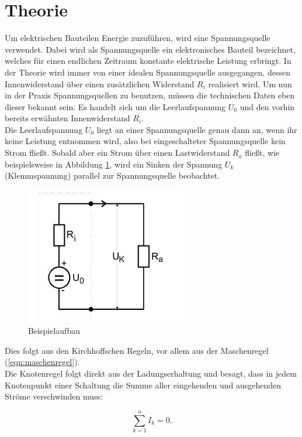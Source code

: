 \section{Theorie}
\label{sec:Theorie}
Um elektrischen Bauteilen Energie zuzuführen, wird eine Spannungsquelle verwendet.
Dabei wird als Spannungsquelle ein elektronisches Bauteil bezeichnet, welches für einen endlichen Zeitraum konstante elektrische Leistung erbringt.
In der Theorie wird immer von einer idealen Spannungsquelle ausgegangen, dessen Innenwiderstand über einen zusätzlichen Widerstand $R_i$ realisiert wird.
Um nun in der Praxis Spannungsquellen zu benutzen, müssen die technischen Daten eben dieser bekannt sein.
Es handelt sich um die Leerlaufspannung $U_0$ und den vorhin bereits erwähnten Innenwiderstand $R_i$.\\
Die Leerlaufspannung $U_0$ liegt an einer Spannungsquelle genau dann an, wenn ihr keine Leistung entnommen wird, also bei eingeschalteter Spannungsquelle kein Strom fließt.
Sobald aber ein Strom über einen Lastwiderstand $R_a$ fließt, wie beispielsweise in Abbildung \ref{fig:t1}, wird ein Sinken der Spannung $U_k$ (Klemmspannung) parallel zur Spannungsquelle beobachtet.

\begin{figure}[H]
  \centering
  \includegraphics[height=6cm]{innenwiderstand.png}
  \caption{Beispielaufbau \cite{sample}}
  \label{fig:t1}
\end{figure}

Dies folgt aus den Kirchhoffschen Regeln, vor allem aus der Maschenregel (\ref{eqn:maschenregel}).\\
Die Knotenregel folgt direkt aus der Ladungserhaltung und besagt, dass in jedem Knotenpunkt einer Schaltung die Summe aller eingehenden und ausgehenden Ströme verschwinden muss:

\begin{equation}
  \sum_{k=1}^n I_k = 0.
  \label{eqn:knotenregel}
\end{equation}

